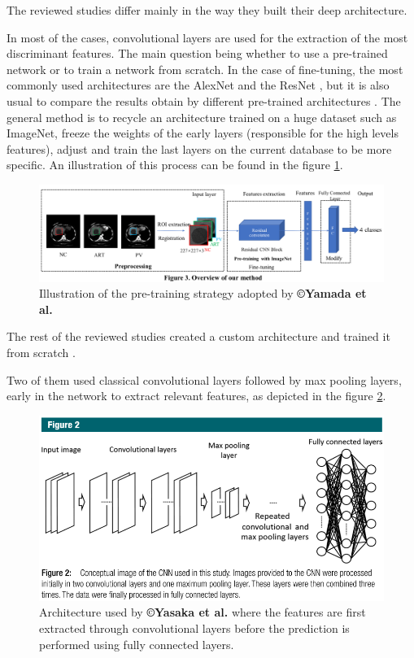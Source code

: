 \documentclass[]{article}
\begin{document}
The reviewed studies differ mainly in the way they built their deep
architecture.

In most of the cases, convolutional layers are used for the extraction
of the most discriminant features. The main question being whether to
use a pre-trained network or to train a network from scratch. In the
case of fine-tuning, the most commonly used architectures are the
AlexNet and the ResNet \cite{WANG2019,Wang2018,Yamada2019,Peng2020}, but it is also usual to
compare the results obtain by different pre-trained architectures \cite{WANG2019,Yamada2019}. The general method
is to recycle an architecture trained on a huge dataset such as
ImageNet, freeze the weights of the early layers (responsible for the
high levels features), adjust and train the last layers on the current
database to be more specific.
An illustration of this process can be found in the figure \ref{Yamada2019_Fig3}.

\begin{figure}[th!]
\centering
\includegraphics[width=0.9\linewidth]{images/image6}
\caption{Illustration of the pre-training strategy adopted by \textbf{©Yamada et al.} \cite{Yamada2019}}
\label{Yamada2019_Fig3}
\end{figure}


The rest of the reviewed studies created a custom architecture and
trained it from scratch \cite{Yasaka2018a,Yasaka2018,Liang2018}.

Two of them used classical convolutional layers followed by max pooling
layers, early in the network to extract relevant features, as depicted
in the figure \ref{Yasaka2018_Fig2}.

\begin{figure}[th!]
\centering
\includegraphics[width=0.7\linewidth]{images/image10}
\caption{Architecture used by \textbf{©Yasaka et al.} where the features are first extracted through convolutional layers before the prediction is performed using fully connected layers. \cite{Yasaka2018}}
\label{Yasaka2018_Fig2}
\end{figure}
\end{document}
